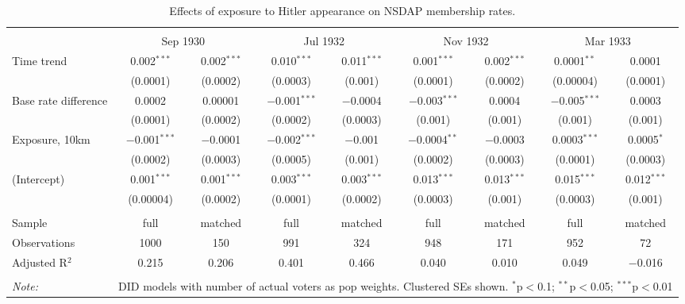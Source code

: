 
\begin{table}[!htbp] \centering 
  \caption{Effects of exposure to Hitler appearance on NSDAP membership rates.\vspace{-.25cm}} 
  \label{tab:nsdap-members-dd} 
\scriptsize 
\begin{tabular}{@{\extracolsep{5pt}}lcccccccc} 
\\[-1.8ex]\hline 
\hline \\[-1.8ex] 
 & \multicolumn{2}{c}{Sep 1930} & \multicolumn{2}{c}{Jul 1932} & \multicolumn{2}{c}{Nov 1932} & \multicolumn{2}{c}{Mar 1933} \\ 
 \cmidrule(r){2-3}\cmidrule(r){4-5}\cmidrule(r){6-7}\cmidrule(r){8-9}Time trend & 0.002$^{***}$ & 0.002$^{***}$ & 0.010$^{***}$ & 0.011$^{***}$ & 0.001$^{***}$ & 0.002$^{***}$ & 0.0001$^{**}$ & 0.0001 \\ 
  & (0.0001) & (0.0002) & (0.0003) & (0.001) & (0.0001) & (0.0002) & (0.00004) & (0.0001) \\ 
  Base rate difference & 0.0002 & 0.00001 & $-$0.001$^{***}$ & $-$0.0004 & $-$0.003$^{***}$ & 0.0004 & $-$0.005$^{***}$ & 0.0003 \\ 
  & (0.0001) & (0.0002) & (0.0002) & (0.0003) & (0.001) & (0.001) & (0.001) & (0.001) \\ 
  Exposure, 10km & $-$0.001$^{***}$ & $-$0.0001 & $-$0.002$^{***}$ & $-$0.001 & $-$0.0004$^{**}$ & $-$0.0003 & 0.0003$^{***}$ & 0.0005$^{*}$ \\ 
  & (0.0002) & (0.0003) & (0.0005) & (0.001) & (0.0002) & (0.0003) & (0.0001) & (0.0003) \\ 
  (Intercept) & 0.001$^{***}$ & 0.001$^{***}$ & 0.003$^{***}$ & 0.003$^{***}$ & 0.013$^{***}$ & 0.013$^{***}$ & 0.015$^{***}$ & 0.012$^{***}$ \\ 
  & (0.00004) & (0.0002) & (0.0001) & (0.0002) & (0.0003) & (0.001) & (0.0003) & (0.001) \\ 
 \hline \\[-1.8ex] 
Sample & full & matched & full & matched & full & matched & full & matched \\ 
Observations & 1000 & 150 & 991 & 324 & 948 & 171 & 952 & 72 \\ 
Adjusted R$^{2}$ & 0.215 & 0.206 & 0.401 & 0.466 & 0.040 & 0.010 & 0.049 & $-$0.016 \\ 
\hline 
\hline \\[-1.8ex] 
\textit{Note:}  & \multicolumn{8}{r}{DID models with number of actual voters as pop weights. Clustered SEs shown. $^{*}$p$<$0.1; $^{**}$p$<$0.05; $^{***}$p$<$0.01} \\ 
\end{tabular} 
\end{table} 
